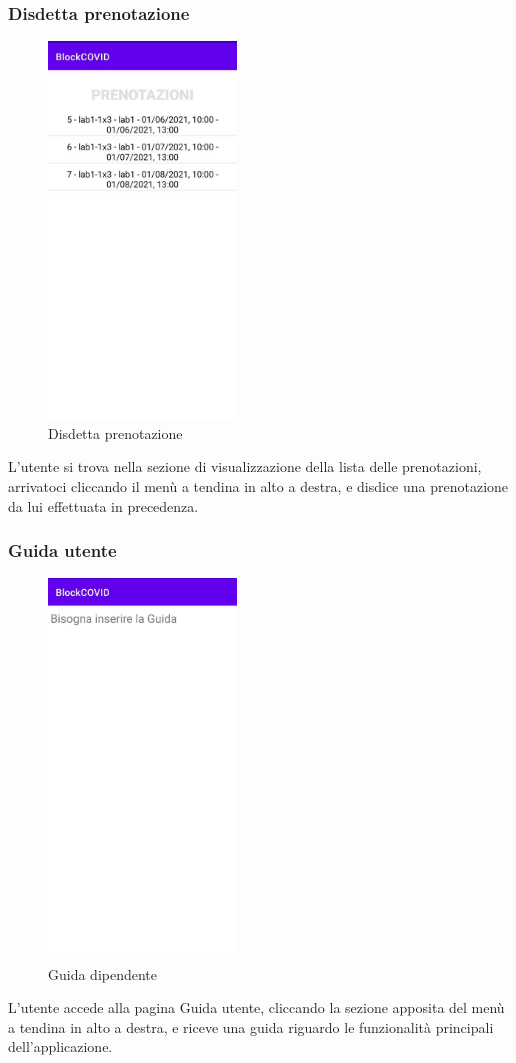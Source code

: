 \subsubsection{Disdetta prenotazione}
\begin{figure}[H]
	\centering
	\includegraphics[width=5cm]{res/images/VisualizzaPrenotazioni.png}
	\caption{Disdetta prenotazione}
\end{figure}
L’utente si trova nella sezione di visualizzazione della lista delle prenotazioni, arrivatoci cliccando il menù a tendina in alto a destra, e disdice una prenotazione da lui effettuata in precedenza.
\subsubsection{Guida utente}
\begin{figure}[H]
	\centering
	\includegraphics[width=5cm]{res/images/Guida.png}
	\caption{Guida dipendente}
\end{figure}
L’utente accede alla pagina Guida utente, cliccando la sezione apposita del menù a tendina in alto a destra, e riceve una guida riguardo le funzionalità principali dell'applicazione.
